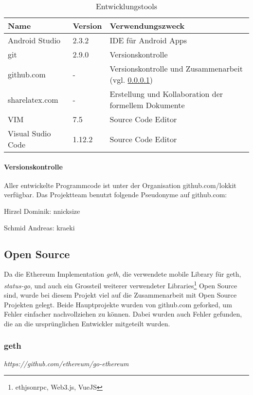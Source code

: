 \begin{table}[H]
\centering
\caption{Entwicklungstools}
\label{tbl:Entwicklungstools}
\begin{tabular}{@{}L{3cm}R{1cm}L{10cm}@{}}
\toprule
Name & Version & Verwendungszweck \\\midrule
Android Studio & 2.3.2 & IDE für Android Apps\\ \midrule
git & 2.9.0 & Versionskontrolle \\ \midrule
github.com & - & Versionskontrolle und Zusammenarbeit (vgl. \ref{para:Versionskontrolle}) \\ \midrule
sharelatex.com & - & Erstellung und Kollaboration der formellem Dokumente\\ \midrule
VIM & 7.5 & Source Code Editor \\ \midrule
Visual Sudio Code & 1.12.2 & Source Code Editor \\ \bottomrule
\end{tabular}
\end{table}

\paragraph{Versionskontrolle}
\label{para:Versionskontrolle}
Aller entwickelte Programmcode ist unter der Organisation github.com/lokkit verfügbar. Das Projektteam benutzt folgende Pseudonyme auf github.com:

Hirzel Dominik: nnicksize

Schmid Andreas: kraeki


\subsection{Open Source}
\label{subsec:Open_Source}
Da die Ethereum Implementation \emph{geth}, die verwendete mobile Library für geth, \emph{status-go}, und auch ein Grossteil weiterer verwendeter Libraries\footnote{ethjsonrpc, Web3.js, VueJS} Open Source sind, wurde bei diesem Projekt viel auf die Zusammenarbeit mit Open Source Projekten gelegt. Beide Hauptprojekte wurden von github.com geforked, um Fehler einfacher nachvollziehen zu können. Dabei wurden auch Fehler gefunden, die an die ursprünglichen Entwickler mitgeteilt wurden.

\subsubsection{geth}
\emph{https://github.com/ethereum/go-ethereum}

